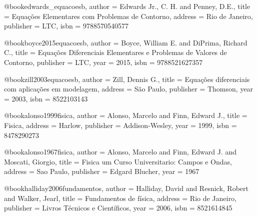 %

@book{edwards_equacoesb,
  author = {Edwards Jr., C. H. and Penney, D.E.},
  title = {Equações Elementares com Problemas de Contorno},
  address = {Rio de Janeiro},
  publisher = {LTC},
  isbn = {9788570540577}
}

@book{boyce2015equacoesb,
  author = {Boyce, William E. and DiPrima, Richard C.},
  title = {Equações Diferenciais Elementares e Problemas de Valores de Contorno},
  publisher = {LTC},
  year = {2015},
  isbn = {9788521627357}
}

@book{zill2003equacoesb,
  author = {Zill, Dennis G.},
  title = {Equações diferenciais com aplicações em modelagem},
  address = {São Paulo},
  publisher = {Thomson},
  year = {2003},
  isbn = {8522103143}%
}

@book{alonso1999fisica,
  author = {Alonso, Marcelo and Finn, Edward J.},
  title = {Fisica},
  address = {Harlow},
  publisher = {Addison-Wesley},
  year = {1999},
  isbn = {8478290273}
}

@book{alonso1967fisica,
  author = {Alonso, Marcelo and Finn, Edward J. and Moscati, Giorgio},
  title = {Fisica um Curso Universitario: Campos e Ondas},
  address = {Sao Paulo},
  publisher = {Edgard Blucher},
  year = {1967}
}

@book{halliday2006fundamentos,
  author = {Halliday, David and Resnick, Robert and Walker, Jearl},
  title = {Fundamentos de física},
  address = {Rio de Janeiro},
  publisher = {Livros Técnicos e Científicos},
  year = {2006}, %
  isbn = {8521614845}%
}

